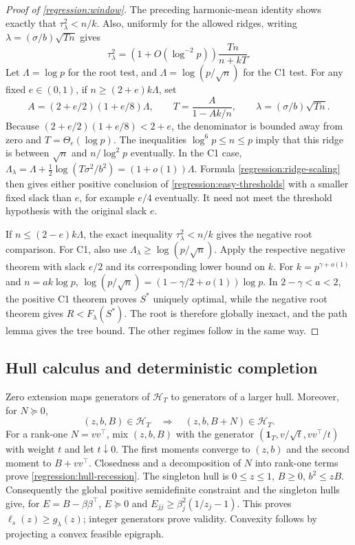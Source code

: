 \begin{proof}[Proof of \cref{regression:window}]
The preceding harmonic-mean identity shows exactly that
$\tau_\lambda^2<n/k$. Also, uniformly for the allowed ridges,
writing $\lambda=(\sigma/b)\sqrt{Tn}$ gives
\begin{equation}\label{regression:ridge-scaling}
 \tau_\lambda^2=(1+O(\log^{-2}p))\frac{Tn}{n+kT}.
\end{equation}
Let $\Lambda=\log p$ for the root test, and
$\Lambda=\log(p/\sqrt n)$ for the C1 test.
For any fixed $e\in(0,1)$, if $n\geq(2+e)k\Lambda$, set
\[
 A=(2+e/2)(1+e/8)\Lambda,\qquad
 T=\frac A{1-Ak/n},\qquad \lambda=(\sigma/b)\sqrt{Tn}.
\]
Because $(2+e/2)(1+e/8)<2+e$, the denominator is bounded away
from zero and $T=\Theta_e(\log p)$.
The inequalities $\log^6p\leq n\leq p$ imply that this ridge is
between $\sqrt n$ and $n/\log^2p$ eventually.
In the C1 case,
$\Lambda_\lambda=\Lambda+\frac12\log(T\sigma^2/b^2)
=(1+o(1))\Lambda$. Formula \eqref{regression:ridge-scaling}
then gives either positive conclusion of
\cref{regression:easy-thresholds} with a smaller fixed slack
than $e$, for example $e/4$ eventually. It need not meet the
threshold hypothesis with the original slack $e$.

If $n\leq(2-e)k\Lambda$, the exact inequality
$\tau_\lambda^2<n/k$ gives the negative root comparison.
For C1, also use $\Lambda_\lambda\geq\log(p/\sqrt n)$.
Apply the respective negative theorem with slack $e/2$ and its
corresponding lower bound on $k$.
For $k=p^{\gamma+o(1)}$ and $n=a k\log p$,
$\log(p/\sqrt n)=(1-\gamma/2+o(1))\log p$.
In $2-\gamma<a<2$, the positive C1 theorem proves $S^*$ uniquely
optimal, while the negative root theorem gives $R<F_\lambda(S^*)$.
The root is therefore globally inexact, and the path lemma gives
the tree bound. The other regimes follow in the same way.
\end{proof}

\subsection{Hull calculus and deterministic completion}
\label{app:regression:hull}

Zero extension maps generators of $\mathcal H_T$ to generators of a
larger hull. Moreover, for $N\succeq0$,
\begin{equation}\label{regression:hull-recession}
 (z,b,B)\in\mathcal H_T\quad\Longrightarrow\quad
                          (z,b,B+N)\in\mathcal H_T .
\end{equation}
For a rank-one $N=vv^\top$, mix $(z,b,B)$ with the generator
$(\mathbf1_T,v/\sqrt t,vv^\top/t)$ with weight $t$ and let
$t\downarrow0$. The first moments converge to $(z,b)$ and the
second moment to $B+vv^\top$. Closedness and a decomposition of
$N$ into rank-one terms prove \eqref{regression:hull-recession}.
The singleton hull is
$0\leq z\leq1$, $B\geq0$, $b^2\leq zB$.
Consequently the global positive semidefinite constraint and the
singleton hulls give, for $E=B-\beta\beta^\top$,
$E\succeq0$ and
$E_{jj}\geq\beta_j^2(1/z_j-1)$. This proves
$\ell_s(z)\geq g_\lambda(z)$; integer generators prove validity.
Convexity follows by projecting a convex feasible epigraph.


